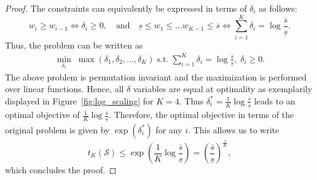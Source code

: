 \documentclass{article}
\newcommand{\mS}{\mathcal{S}}
\begin{document}
\begin{proof}
The constraints can equivalently be expressed in terms of \(\delta_i\) as follows:
\begin{equation*}
	w_i \geq w_{i-1} \iff \delta_i \geq 0, \quad \text{and} \quad 	\underline{s} \leq w_1 \leq \dots w_{K-1} \leq \overline{s} \iff \sum_{i=1}^{K}\delta_i = \log \frac{\overline{s}}{\underline{s}} .
\end{equation*}
Thus, the problem can be written as
\begin{equation*}
\begin{aligned}
	\min_{\delta_i} \; \max\left(\delta_1, \delta_2, \dots, \delta_K\right)
	\;\text{s.t.} \; \sum_{i=1}^{K}\delta_i = \log \frac{\overline{s}}{\underline{s}},\; \delta_i \geq 0.
\end{aligned}
\end{equation*}
The above problem is permutation invariant and the maximization is performed over linear functions. 
Hence, all \(\delta\) variables are equal at optimality as exemplarily displayed in Figure~\ref{fig:log_scaling} for $K=4$.
Thus \(\delta_i^{*} = \frac{1}{K}\log \frac{\overline{s}}{\underline{s}} \) leads to an optimal objective of \(\frac{1}{K}\log \frac{\overline{s}}{\underline{s}}\).
Therefore, the optimal objective in terms of the original problem is given by \(\exp(\delta_i^*)\) for any \(i\).
This allows us to write
\[
t_K(\mS) \leq \exp \left(\frac{1}{K}\log \frac{\overline{s}}{\underline{s}} \right) = \left(\frac{\overline{s}}{\underline{s}}\right)^{\frac{1}{K}},
\]
which concludes the proof.
\end{proof}
\end{document}
